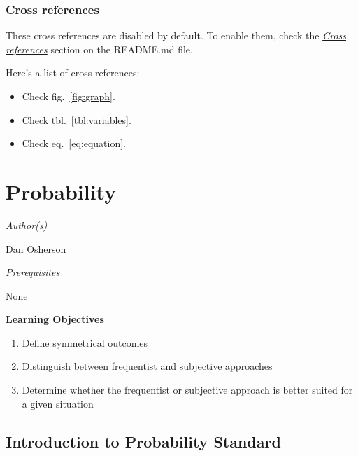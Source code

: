 \documentclass[
  11pt,
,
onecolumn,
openany
]{book}
\providecommand{\tightlist}{%
  \setlength{\itemsep}{0pt}\setlength{\parskip}{0pt}}
\begin{document}
\hypertarget{cross-references}{%
\subsection{Cross references}\label{cross-references}}

These cross references are disabled by default. To enable them, check the
\emph{\href{https://github.com/wikiti/pandoc-book-template\#cross-references}{Cross
references}} section on the README.md file.

Here's a list of cross references:

\begin{itemize}
\tightlist
\item
  Check fig.~\ref{fig:graph}.
\item
  Check tbl.~\ref{tbl:variables}.
\item
  Check eq.~\ref{eq:equation}.
\end{itemize}

\hypertarget{probability}{%
\chapter{Probability}\label{probability}}

\emph{Author(s)}

Dan Osherson

\emph{Prerequisites}

None

\textbf{Learning Objectives}

\begin{enumerate}
\def\labelenumi{\arabic{enumi}.}
\item
  Define symmetrical outcomes
\item
  Distinguish between frequentist and subjective approaches
\item
  Determine whether the frequentist or subjective approach is better suited
  for a given situation
\end{enumerate}

\hypertarget{introduction-to-probability-standard}{%
\section{Introduction to Probability
Standard}\label{introduction-to-probability-standard}}
\end{document}
